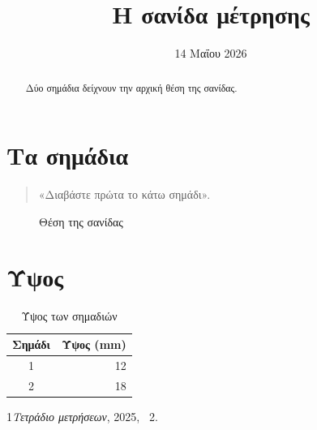 \documentclass{article}
\begin{document}
\title{Η σανίδα μέτρησης}\author{}\date{14 Μαΐου 2026}\maketitle
\begin{abstract}Δύο σημάδια δείχνουν την αρχική θέση της σανίδας.\end{abstract}
\tableofcontents
\section{Τα σημάδια}\begin{quote}«Διαβάστε πρώτα το κάτω σημάδι».\end{quote}
\begin{figure}[ht]\centering\fbox{\rule{0pt}{8mm}\rule{33mm}{0pt}}\caption{Θέση της σανίδας}\end{figure}
\section{Ύψος}
\begin{table}[ht]\centering\begin{tabular}{cr}Σημάδι&Ύψος (mm)\\\hline 1&12\\2&18\end{tabular}\caption{Ύψος των σημαδιών}\end{table}
\begin{thebibliography}{1}\emph{Τετράδιο μετρήσεων}, 2025, \chaptername~2.\end{thebibliography}
\end{document}
